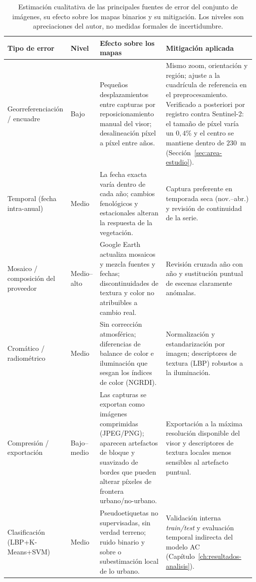 \begin{table}[h]
\centering
\caption{Estimación cualitativa de las principales fuentes de error del conjunto de imágenes, su efecto sobre los mapas binarios y su mitigación. Los niveles son apreciaciones del autor, no medidas formales de incertidumbre.}
\begin{tabularx}{\textwidth}{|>{\raggedright\arraybackslash}p{}|>{\centering\arraybackslash}p{}|>{\raggedright\arraybackslash}X|>{\raggedright\arraybackslash}p{}|}
\hline
	\textbf{Tipo de error} & \textbf{Nivel} & \textbf{Efecto sobre los mapas} & \textbf{Mitigación aplicada} \\
\hline
Georreferenciación / encuadre & Bajo & Pequeños desplazamientos entre capturas por reposicionamiento manual del visor; desalineación píxel a píxel entre años. & Mismo zoom, orientación y región; ajuste a la cuadrícula de referencia en el preprocesamiento. Verificado a posteriori por registro contra Sentinel-2: el tamaño de píxel varía un $0{,}4$\% y el centro se mantiene dentro de $230$~m (Sección~\ref{sec:area-estudio}). \\
\hline
Temporal (fecha intra-anual) & Medio & La fecha exacta varía dentro de cada año; cambios fenológicos y estacionales alteran la respuesta de la vegetación. & Captura preferente en temporada seca (nov.--abr.) y revisión de continuidad de la serie. \\
\hline
Mosaico / composición del proveedor & Medio--alto & Google Earth actualiza mosaicos y mezcla fuentes y fechas; discontinuidades de textura y color no atribuibles a cambio real. & Revisión cruzada año con año y sustitución puntual de escenas claramente anómalas. \\
\hline
Cromático / radiométrico & Medio & Sin corrección atmosférica; diferencias de balance de color e iluminación que sesgan los índices de color (NGRDI). & Normalización y estandarización por imagen; descriptores de textura (LBP) robustos a la iluminación. \\
\hline
Compresión / exportación & Bajo--medio & Las capturas se exportan como imágenes comprimidas (JPEG/PNG); aparecen artefactos de bloque y suavizado de bordes que pueden alterar píxeles de frontera urbano/no-urbano. & Exportación a la máxima resolución disponible del visor y descriptores de textura locales menos sensibles al artefacto puntual. \\
\hline
Clasificación (LBP+K-Means+SVM) & Medio & Pseudoetiquetas no supervisadas, sin verdad terreno; ruido binario y sobre o subestimación local de lo urbano. & Validación interna \textit{train/test} y evaluación temporal indirecta del modelo AC (Capítulo~\ref{ch:resultados-analisis}). \\
\hline
\end{tabularx}
\label{tab:uncertainty}
\end{table}

